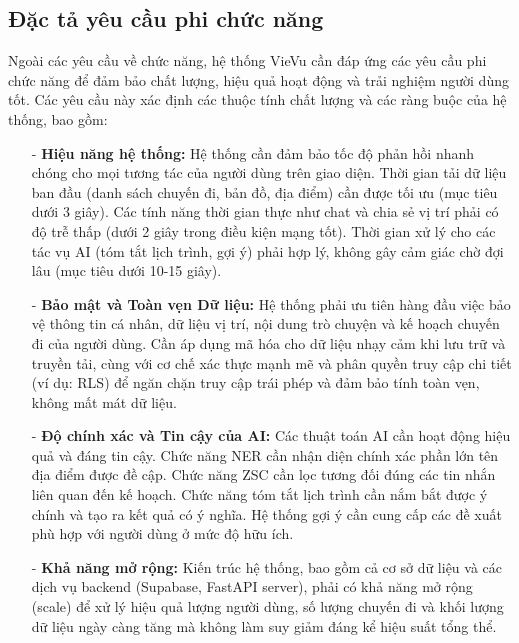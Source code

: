 \subsection{Đặc tả yêu cầu phi chức năng}
\label{subsec:non_functional_requirements}

Ngoài các yêu cầu về chức năng, hệ thống VieVu cần đáp ứng các yêu cầu phi chức năng để đảm bảo chất lượng, hiệu quả hoạt động và trải nghiệm người dùng tốt. Các yêu cầu này xác định các thuộc tính chất lượng và các ràng buộc của hệ thống, bao gồm:

\begin{itemize}
    \item[-] \textbf{Hiệu năng hệ thống:} Hệ thống cần đảm bảo tốc độ phản hồi nhanh chóng cho mọi tương tác của người dùng trên giao diện. Thời gian tải dữ liệu ban đầu (danh sách chuyến đi, bản đồ, địa điểm) cần được tối ưu (mục tiêu dưới 3 giây). Các tính năng thời gian thực như chat và chia sẻ vị trí phải có độ trễ thấp (dưới 2 giây trong điều kiện mạng tốt). Thời gian xử lý cho các tác vụ AI (tóm tắt lịch trình, gợi ý) phải hợp lý, không gây cảm giác chờ đợi lâu (mục tiêu dưới 10-15 giây).

    \item[-] \textbf{Bảo mật và Toàn vẹn Dữ liệu:} Hệ thống phải ưu tiên hàng đầu việc bảo vệ thông tin cá nhân, dữ liệu vị trí, nội dung trò chuyện và kế hoạch chuyến đi của người dùng. Cần áp dụng mã hóa cho dữ liệu nhạy cảm khi lưu trữ và truyền tải, cùng với cơ chế xác thực mạnh mẽ và phân quyền truy cập chi tiết (ví dụ: RLS) để ngăn chặn truy cập trái phép và đảm bảo tính toàn vẹn, không mất mát dữ liệu.

    \item[-] \textbf{Độ chính xác và Tin cậy của AI:} Các thuật toán AI cần hoạt động hiệu quả và đáng tin cậy. Chức năng NER cần nhận diện chính xác phần lớn tên địa điểm được đề cập. Chức năng ZSC cần lọc tương đối đúng các tin nhắn liên quan đến kế hoạch. Chức năng tóm tắt lịch trình cần nắm bắt được ý chính và tạo ra kết quả có ý nghĩa. Hệ thống gợi ý cần cung cấp các đề xuất phù hợp với người dùng ở mức độ hữu ích.

    \item[-] \textbf{Khả năng mở rộng:} Kiến trúc hệ thống, bao gồm cả cơ sở dữ liệu và các dịch vụ backend (Supabase, FastAPI server), phải có khả năng mở rộng (scale) để xử lý hiệu quả lượng người dùng, số lượng chuyến đi và khối lượng dữ liệu ngày càng tăng mà không làm suy giảm đáng kể hiệu suất tổng thể.


\end{itemize}
